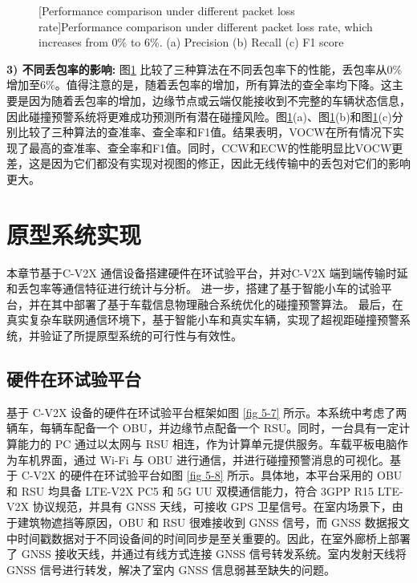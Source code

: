 \begin{figure}[h]
     \centering
     [Performance comparison under different packet loss rate]{Performance comparison under different packet loss rate, which increases from 0\% to 6\%. (a) Precision (b) Recall (c) F1 score}
     \label{fig 5-6}
\end{figure}

\textbf{3) 不同丢包率的影响:}
图\ref{fig 5-6} 比较了三种算法在不同丢包率下的性能，丢包率从0\%增加至6\%。值得注意的是，随着丢包率的增加，所有算法的查全率均下降。这主要是因为随着丢包率的增加，边缘节点或云端仅能接收到不完整的车辆状态信息，因此碰撞预警系统将更难成功预测所有潜在碰撞风险。图\ref{fig 5-6}(a)、图\ref{fig 5-6}(b)和图\ref{fig 5-6}(c)分别比较了三种算法的查准率、查全率和F1值。结果表明，VOCW在所有情况下实现了最高的查准率、查全率和F1值。同时，CCW和ECW的性能明显比VOCW更差，这是因为它们都没有实现对视图的修正，因此无线传输中的丢包对它们的影响更大。

\section{原型系统实现}\label{section 5-5}

本章节基于C-V2X 通信设备搭建硬件在环试验平台，并对C-V2X 端到端传输时延和丢包率等通信特征进行统计与分析。
进一步，搭建了基于智能小车的试验平台，并在其中部署了基于车载信息物理融合系统优化的碰撞预警算法。
最后，在真实复杂车联网通信环境下，基于智能小车和真实车辆，实现了超视距碰撞预警系统，并验证了所提原型系统的可行性与有效性。

\subsection{硬件在环试验平台}

基于 C-V2X 设备的硬件在环试验平台框架如图 \ref{fig 5-7} 所示。本系统中考虑了两辆车，每辆车配备一个 OBU，并边缘节点配备一个 RSU。同时，一台具有一定计算能力的 PC 通过以太网与 RSU 相连，作为计算单元提供服务。车载平板电脑作为车机界面，通过 Wi-Fi 与 OBU 进行通信，并进行碰撞预警消息的可视化。基于 C-V2X 的硬件在环试验平台如图 \ref{fig 5-8} 所示。具体地，本平台采用的 OBU 和 RSU 均具备 LTE-V2X PC5 和 5G UU 双模通信能力，符合 3GPP R15 LTE-V2X 协议规范，并具有 GNSS 天线，可接收 GPS 卫星信号。在室内场景下，由于建筑物遮挡等原因，OBU 和 RSU 很难接收到 GNSS 信号，而 GNSS 数据报文中时间戳数据对于不同设备间的时间同步是至关重要的。因此，在室外廊桥上部署了 GNSS 接收天线，并通过有线方式连接 GNSS 信号转发系统。室内发射天线将 GNSS 信号进行转发，解决了室内 GNSS 信息弱甚至缺失的问题。

